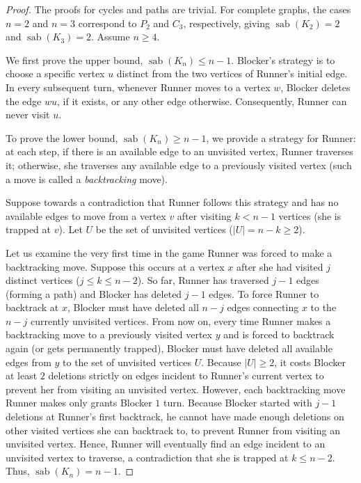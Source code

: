 \documentclass[12pt]{article}
\DeclareMathOperator{\sab}{\mathrm{sab}}
\begin{document}
\begin{proof}
    The proofs for cycles and paths are trivial. For complete graphs, the cases $n=2$ and $n=3$ correspond to $P_2$ and $C_3$, respectively, giving $\sab(K_2) = 2$ and $\sab(K_3) = 2$. Assume $n \geq 4$. 

    We first prove the upper bound, $\sab(K_n) \leq n-1$. Blocker's strategy is to choose a specific vertex $u$ distinct from the two vertices of Runner's initial edge. In every subsequent turn, whenever Runner moves to a vertex $w$, Blocker deletes the edge $wu$, if it exists, or any other edge otherwise. Consequently, Runner can never visit $u$.

    To prove the lower bound, $\sab(K_n) \geq n-1$, we provide a strategy for Runner: at each step, if there is an available edge to an unvisited vertex, Runner traverses it; otherwise, she traverses any available edge to a previously visited vertex (such a move is called a \emph{backtracking} move).

    Suppose towards a contradiction that Runner follows this strategy and has no available edges to move from a vertex $v$ after visiting $k < n-1$ vertices (she is trapped at $v$). Let $U$ be the set of unvisited vertices ($|U|=n-k \geq 2$). 

    Let us examine the very first time in the game Runner was forced to make a backtracking move. Suppose this occurs at a vertex $x$ after she had visited $j$ distinct vertices ($j \le k \le n-2$). So far, Runner has traversed $j-1$ edges (forming a path) and Blocker has deleted $j-1$ edges. To force Runner to backtrack at $x$, Blocker must have deleted all $n-j$ edges connecting $x$ to the $n-j$ currently unvisited vertices. From now on, every time Runner makes a backtracking move to a previously visited vertex $y$ and is forced to backtrack again (or gets permanently trapped), Blocker must have deleted all available edges from $y$ to the set of unvisited vertices $U$. Because $|U| \ge 2$, it costs Blocker at least $2$ deletions strictly on edges incident to Runner's current vertex to prevent her from visiting an unvisited vertex. However, each backtracking move Runner makes only grants Blocker $1$ turn. Because Blocker started with $j-1$ deletions at Runner's first backtrack, he cannot have made enough deletions on other visited vertices she can backtrack to, to prevent Runner from visiting an unvisited vertex. Hence, Runner will eventually find an edge incident to an unvisited vertex to traverse, a contradiction that she is trapped at $k \le n-2$. Thus, $\sab(K_n) = n-1$.
\end{proof}
\end{document}
